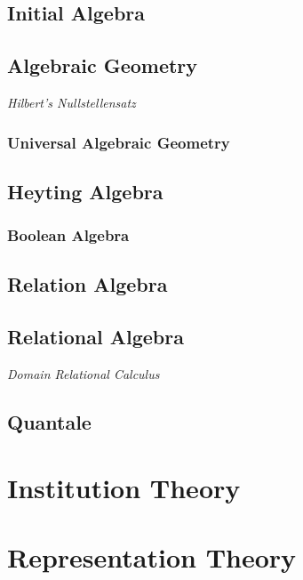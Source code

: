 \subsection{Initial Algebra}\label{subsec:initial_algebra}
\subsection{Algebraic Geometry}\label{subsec:algebraic_geometry}
\emph{Hilbert's Nullstellensatz}
\subsubsection{Universal Algebraic Geometry}
\subsection{Heyting Algebra}\label{subsec:heyting_algebra}
\subsubsection{Boolean Algebra}\label{subsec:boolean_algebra}
\subsection{Relation Algebra}
\subsection{Relational Algebra}
\emph{Domain Relational Calculus}
\subsection{Quantale}

\section{Institution Theory}\label{subsec:institution_theory}
\section{Representation Theory}
